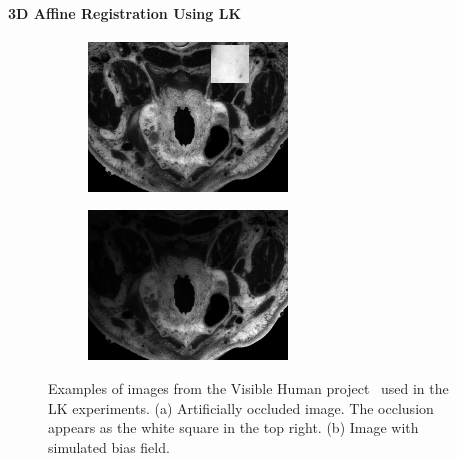 \paragraph{3D Affine Registration Using LK}\label{subsubsec:lk_results}
\begin{figure}[t]
    \centering
    \begin{subfigure}{0.47\columnwidth}
        \includegraphics[width=\textwidth]{statistical_normals/lk/3d/images/occluded-example}
        \caption{}\label{fig:lk_occluded_example}
    \end{subfigure}
    \begin{subfigure}{0.47\columnwidth}
        \includegraphics[width=\textwidth]{statistical_normals/lk/3d/images/biasfield-example}
        \caption{}\label{fig:lk_biasfield_example}
    \end{subfigure}
    \caption{Examples of images from the Visible Human
             project~\cite{spitzer1996visiblehuman}
             used in the LK experiments. (a) Artificially occluded image. The
             occlusion appears as the white square in the top right. (b) Image
             with simulated bias field.}
\label{fig:lk_affine_examples}
\end{figure}
